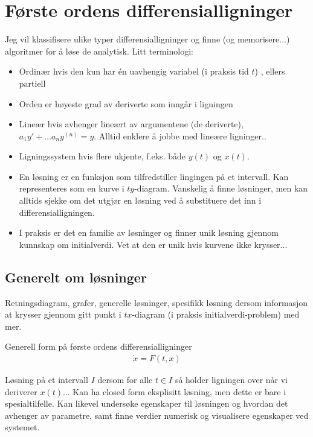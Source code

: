 \section{Første ordens differensialligninger}
Jeg vil klassifisere ulike typer differensialligninger og finne (og memorisere...) algoritmer for å løse de analytisk. Litt terminologi:
\begin{itemize}
\item Ordinær hvis den kun har én uavhengig variabel (i praksis tid $t$) , ellers partiell
\item Orden er høyeste grad av deriverte som inngår i ligningen
\item Lineær hvis avhenger lineært av argumentene (de deriverte), $a_1 y' + \dots a_n y^{(n)}=y$. Alltid enklere å jobbe med lineære ligninger..
\item Ligningssystem hvis flere ukjente, f.eks. både $y(t)$ og $x(t)$. 
\item En løsning er en funksjon som tilfredstiller lingingen på et intervall. Kan representeres som en kurve i $ty$-diagram. Vanskelig å finne løsninger, men kan alltids sjekke om det utgjør en løsning ved å substituere det inn i differensialligningen.
\item I praksis er det en familie av løsninger og finner unik løsning gjennom kunnskap om initialverdi. Vet at den er unik hvis kurvene ikke krysser... 
\end{itemize}
\subsection{Generelt om løsninger}
Retningsdiagram, grafer, generelle løsninger, spesifikk løsning dersom informasjon at krysser gjennom gitt punkt i $tx$-diagram (i praksis initialverdi-problem) med mer.

Generell form på første ordens differensialligninger
\begin{align}
\dot{x}=F(t,x)
\end{align}

Løsning på et intervall $I$ dersom for alle $t \in I$ så holder ligningen over når vi deriverer $x(t)$... Kan ha closed form eksplisitt løsning, men dette er bare i spesialtilfelle. Kan likevel undersøke egenskaper til løsningen og hvordan det avhenger av parametre, samt finne verdier numerisk og visualisere egenskaper ved systemet.
